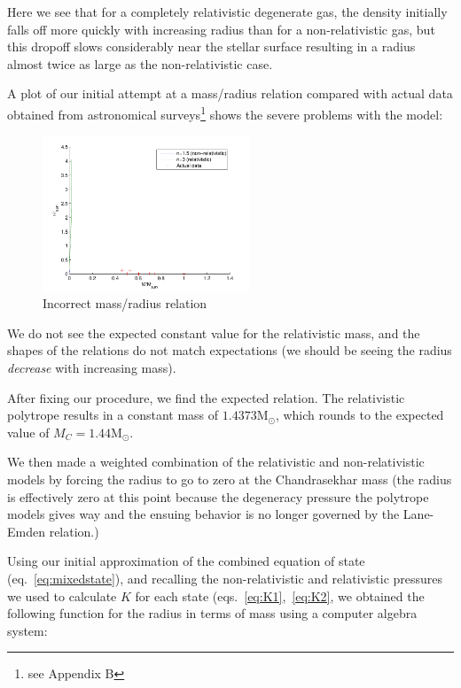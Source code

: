 \documentclass[twoside]{article}
\begin{document}
\begin{multicols}{2}
Here we see that for a completely relativistic degenerate gas, the density
initially falls off more quickly with increasing radius than for a
non-relativistic gas, but this dropoff slows considerably near the stellar
surface resulting in a radius almost twice as large as the non-relativistic
case.


A plot of our initial attempt at a mass/radius relation compared with actual
data obtained from astronomical surveys\footnote{see Appendix B} shows the severe problems with the
model:

\begin{figure}[H]
    \caption{Incorrect mass/radius relation}
    \includegraphics[width=0.55\textwidth]{mr-data.pdf}
\end{figure}

We do not see the expected constant value for the relativistic mass, and the
shapes of the relations do not match expectations (we should be seeing the
radius \emph{decrease} with increasing mass).

After fixing our procedure, we find the expected relation. The relativistic
polytrope results in a constant mass of \(1.4373 \textrm{M}_{\odot}\), which rounds to
the expected value of \(M_C=1.44 \textrm{M}_{\odot}\).

We then made a weighted combination of the relativistic and non-relativistic
models by forcing the radius to go to zero at the Chandrasekhar mass (the radius
is effectively zero at this point because the degeneracy pressure the polytrope
models gives way and the ensuing behavior is no longer governed by the
Lane-Emden relation.)

Using our initial approximation of the combined equation of state
(eq.~\ref{eq:mixedstate}), and recalling the non-relativistic and relativistic
pressures we used to calculate \(K\) for each state
(eqs.~\ref{eq:K1},~\ref{eq:K2}, we obtained the following function for the
radius in terms of mass using a computer algebra system:


\end{multicols}
\end{document}
